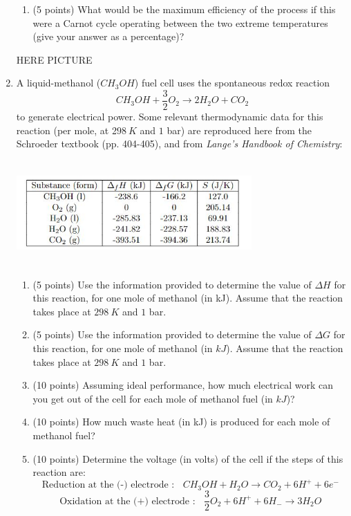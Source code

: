 \documentclass[fleqn]{article}
\begin{document}
\begin{enumerate}
\begin{enumerate}
      \item (5 points) What would be the maximum efficiency of the process if this were a Carnot cycle
      operating between the two extreme temperatures (give your answer as a percentage)?

    \end{enumerate}

    HERE PICTURE

    \pagebreak

    \item A liquid-methanol ($CH_3 OH$) fuel cell uses the spontaneous redox reaction
    $$
      CH_3 OH+\dfrac{3}{2} O_2 \longrightarrow 2H_2 O+CO_2
    $$
    to generate electrical power. Some relevant thermodynamic data for this reaction (per mole, at
    2$98 ~ K$ and $1$ bar) are reproduced here from the Schroeder textbook (pp. 404-405), and from
    \emph{Lange's Handbook of Chemistry}:
    \begin{center}
      \includegraphics[height=4cm, width=9cm]{question7.JPG}
    \end{center}
    \begin{enumerate}
      \item (5 points) Use the information provided to determine the value of $\Delta H$ for this reaction, for
      one mole of methanol (in kJ). Assume that the reaction takes place at $298 ~ K$ and $1$ bar.

      \item (5 points) Use the information provided to determine the value of $\Delta G$ for this reaction, for
      one mole of methanol (in $kJ$). Assume that the reaction takes place at $298 ~ K$ and $1$ bar.


      \item (10 points) Assuming ideal performance, how much electrical work can you get out of the
      cell for each mole of methanol fuel (in $kJ$)?


      \item (10 points) How much waste heat (in kJ) is produced for each mole of methanol fuel?


      \item (10 points) Determine the voltage (in volts) of the cell if the steps of this reaction are:
      $$
        \text{Reduction at the (-) electrode :} ~~~~ CH_3 OH+H_2 O \longrightarrow CO_2+6H^++6e^-
      $$
      $$
        \text{Oxidation at the (+) electrode :} ~~~~ \dfrac{3}{2} O_2+6H^+ +6H_- \longrightarrow 3H_2 O 
      $$


\end{enumerate}
\end{enumerate}
\end{document}
